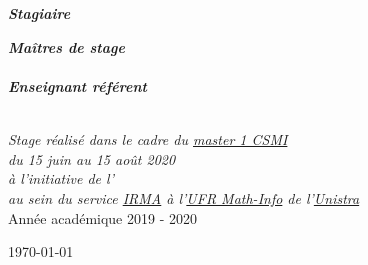 \documentclass[ 
11pt, %
french, %
singlespacing, %
parskip, %
headsepline, %
openany, %
]{MastersDoctoralThesis} %
\renewcommand{\emph}[1]{\textbf{\textit{#1}}} %
\begin{document}
\begin{titlepage}
\begin{center}
\HRule \\[0.4cm] %
{\huge \bfseries \ttitle\par}\vspace{0.4cm} %
\HRule \\[1.5cm] %

\begin{minipage}[t]{0.4\textwidth}
\begin{flushleft} \large
\vspace{7mm}
\emph{Stagiaire}\\
\href{https://github.com/desmond-rn}{\authorname} %
\end{flushleft}
\end{minipage}
\begin{minipage}[t]{0.4\textwidth}
\begin{flushright} \large
\emph{Maîtres de stage} \\
\href{http://irma.math.unistra.fr/}{\supname} %
\\ \vspace{5mm}
\emph{Enseignant référent} \\
\href{http://www.feelpp.org/team/prudhomm/}{\examname} %
\end{flushright}
\end{minipage}\\[2cm]


\large \textit{Stage réalisé dans le cadre du \href{https://docs.google.com/document/d/10JbbXeqqu5J2BjMkSQRNQ8Gx7xBPOClLKpvd7EBZT8U/edit}{master 1 CSMI}}\\[0.2cm] %
\textit{du 15 juin au 15 août 2020}\\[0.2cm]
\textit{à l'initiative de l'\groupname}\\[0.2cm] %
\textit{au sein du service \href{http://irma.math.unistra.fr/}{IRMA} à l'\href{https://mathinfo.unistra.fr/}{UFR Math-Info} de l'\href{http://www.unistra.fr}{Unistra}}\\[2cm] %

\large Année académique 2019 - 2020

\vfill

{\large \today}\\[4cm] %

\end{center}
\end{titlepage}
\end{document}
